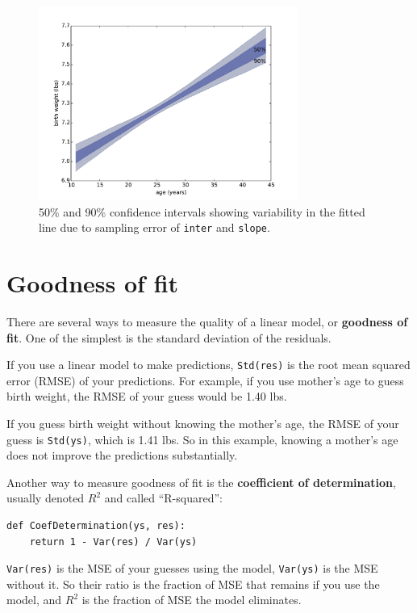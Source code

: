 \documentclass[12pt]{book}
\begin{document}
\begin{figure}
\centerline{\includegraphics[height=2.5in]{figs/linear3.pdf}}
\caption{50\% and 90\% confidence intervals showing variability in the
  fitted line due to sampling error of {\tt inter} and {\tt slope}.}
\label{linear3}
\end{figure}


\section{Goodness of fit}
\label{goodness}

There are several ways to measure the quality of a linear model, or
{\bf goodness of fit}.  One of the simplest is the standard deviation
of the residuals.

If you use a linear model to make predictions, {\tt Std(res)}
is the root mean squared error (RMSE) of your predictions.  For
example, if you use mother's age to guess birth weight, the RMSE of
your guess would be 1.40 lbs.

If you guess birth weight without knowing the mother's age, the RMSE
of your guess is {\tt Std(ys)}, which is 1.41 lbs.  So in this
example, knowing a mother's age does not improve the predictions
substantially.

Another way to measure goodness of fit is  the {\bf
  coefficient of determination}, usually denoted $R^2$ and 
called ``R-squared'':

\begin{verbatim}
def CoefDetermination(ys, res):
    return 1 - Var(res) / Var(ys)
\end{verbatim}

{\tt Var(res)} is the MSE of your guesses using the model,
{\tt Var(ys)} is the MSE without it.   So their ratio is the fraction
of MSE that remains if you use the model, and $R^2$ is the fraction
of MSE the model eliminates.
\end{document}
